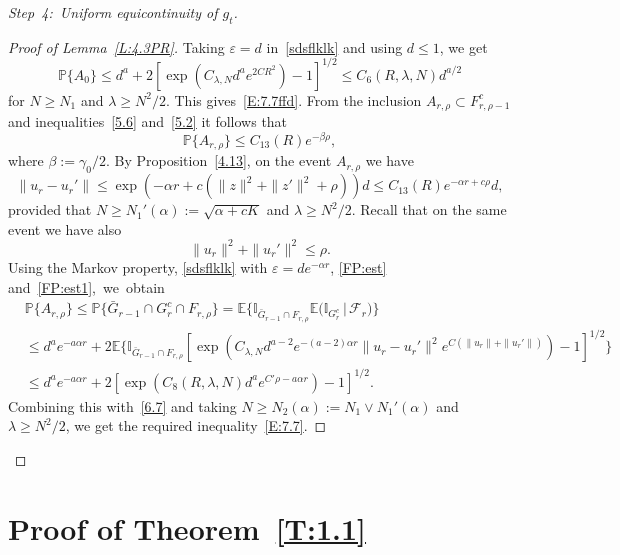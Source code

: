 \documentclass[AHL,Unicode,longabstracts]{cedram}
\newcommand{\e}{\varepsilon}
\newcommand{\IP}{{\mathbb P}}
\newcommand{\pP}{{\mathbb P}}
\newcommand{\I}{{\mathbb I}}
\newcommand{\E}{{\mathbb E}}
\newcommand{\FF}{{\mathcal F}}
\newcommand{\la}{\lambda}
\newenvironment{step}{\begin{proof}}{\let\qed\relax \end{proof}}
\begin{document}
\begin{step}[Step~4:~Uniform equicontinuity of $g_t$]
\begin{proof}[Proof of Lemma~\ref{L:4.3PR}]
Taking $\e=d$ in~\eqref{sdsflklk} and using $d\le1$, we get
\[
\IP\bigl\{ A_0 \bigr\}
\le d^a+2\left[\exp\left(C_{\la, N} d^{a} e^{ {2C R^2}} \right)-1\right]^{1/2}\le C_6(R,\la, N)d^{a/2}
\]
for $N \ge N_1$ and $\la\ge N^2/2 $.
This gives~\eqref{E:7.7ffd}. From the inclusion $A_{r,\rho}\subset F_{r,\rho-1}^c$ and inequalities~\eqref{5.6} and~\eqref{5.2} it follows that
\begin{equation}\label{6.7}
\pP\{A_{r,\rho}\}\le C_{13}(R) e^{-\beta\rho},
\end{equation}
where $ \beta:= \gamma_0/2$. By Proposition~\ref{4.13}, on the event $A_{r,\rho}$ we have
\begin{equation}
\|u_{r}-u_{r}'\|
\le \exp(-\alpha r + c(\| z\|^2 +\|z'\|^2+\rho))d\le C_{13}(R) e^{-\alpha r +c\rho}d, \label{FP:est}
\end{equation}
provided that $N\ge N_1'(\alpha):=\sqrt{\alpha +cK} $ and $\la\ge N^2/2 $. Recall that on the same event we have also
\begin{equation}\label{FP:est1}
\| u_r\|^2 +\|u_r'\|^2\le \rho.
\end{equation}
Using the Markov property, \eqref{sdsflklk} with $\e=de^{-\alpha r}$, \eqref{FP:est} and~\eqref{FP:est1},~we~obtain
\begin{align*}
&\IP\{A_{r,\rho}\}\le\IP\bigl\{\bar G_{r-1} \cap G_r^c \cap F_{r,\rho}\bigr\} =\E\bigl\{\I_{\bar G_{r-1}\cap F_{r,\rho}}\E\bigl(\I_{G_r^c}\,\big|\,\FF_{r}\bigr)\bigr\}\\
&\le d^ae^{-a\alpha r} +2\E\Big\{\I_{\bar G_{r-1}\cap F_{r,\rho}}\!\! \left[\exp\left(C_{\la,N} d^{a-2} e^{-(a-2)\alpha r}\|u_r\!-\!u_r'\|^2 e^{C(\| u_r\|+\|u_r'\|)} \right)-1\right]^{1/2}\!\Big\}\\
&\le d^ae^{-a\alpha r}+2\left[\exp\left(C_8(R,\la,N)d^a e^{C'\rho-a\alpha r} \right)-1\right]^{1/2}.
\end{align*}
Combining this with~\eqref{6.7} and taking $N\ge N_2(\alpha):=N_1\vee N_1'(\alpha) $ and $\la\ge N^2/2 $, we get the required inequality~\eqref{E:7.7}.
\end{proof}
\end{step}


\section{Proof of Theorem~\ref{T:1.1}}\label{S:3Sd}
\end{document}
